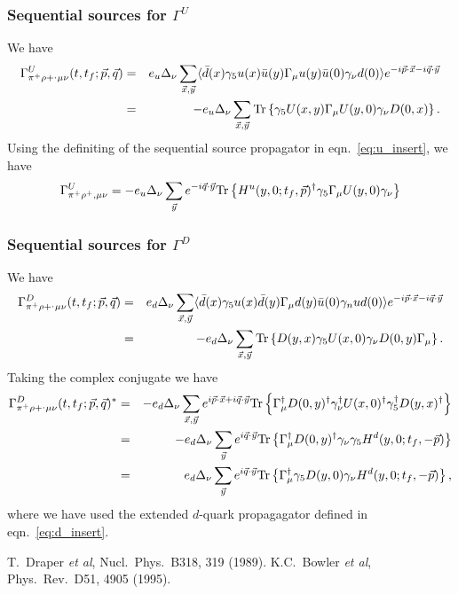 \documentclass[12pt]{article}
\newcommand{\pdotx}{\vec{p} \cdot \vec{x}}
\newcommand{\qdoty}{\vec{q} \cdot \vec{y}}
\begin{document}
\subsubsection{Sequential sources for $\Gamma^U$}
We have
\begin{eqnarray}
\Gamma^U_{\pi^+ \rho+^, \mu\nu}(t, t_f; \vec{p}, \vec{q}) & = &
e_u \Delta_{\nu} \sum_{\vec{x}, \vec{y}} \langle \bar{d}(x) \gamma_5
u(x) \bar{u}(y) \Gamma_\mu u(y) \bar{u}(0) \gamma_\nu d(0) \rangle
e^{-i\pdotx - i \qdoty}\nonumber \\
& = & - e_u \Delta_\nu \sum_{\vec{x},\vec{y}} {\rm Tr} \left\{
\gamma_5 U(x,y) \Gamma_\mu U(y,0) \gamma_{\nu} D(0,x) \right\}.
\end{eqnarray}
Using the definiting of the sequential source propagator in
eqn.~\ref{eq:u_insert}, we have
\begin{equation}
\Gamma^U_{\pi^+ \rho^+, \mu\nu} = -e_u \Delta_{\nu} \sum_{\vec{y}}
e^{-i\qdoty} {\rm Tr} \left\{ H^u(y,0; t_f, \vec{p})^{\dagger}
\gamma_5 \Gamma_\mu U(y,0) \gamma_{\nu} \right\}
\end{equation}

\subsubsection{Sequential sources for $\Gamma^D$}
We have
\begin{eqnarray}
\Gamma^D_{\pi^+ \rho+^, \mu\nu}(t, t_f; \vec{p}, \vec{q}) & = &
e_d \Delta_{\nu} \sum_{\vec{x}, \vec{y}} \langle \bar{d}(x) \gamma_5
u(x) \bar{d}(y) \Gamma_\mu d(y) \bar{u}(0) \gamma_nu d(0) \rangle
e^{-i\pdotx - i \qdoty}\nonumber \nonumber \\
& = & - e_d \Delta_\nu \sum_{\vec{x},\vec{y}} {\rm Tr} \left\{ D(y,x)
\gamma_5 U(x,0) \gamma_\nu D(0,y) \Gamma_\mu \right\}.
\end{eqnarray}
Taking the complex conjugate we have
\begin{eqnarray}
\Gamma^D_{\pi^+ \rho+^, \mu\nu}(t, t_f; \vec{p}, \vec{q})^* & = &
- e_d \Delta_\nu \sum_{\vec{x},\vec{y}} e^{i\pdotx + i \qdoty}{\rm Tr} \left\{
\Gamma_\mu^{\dagger} D(0,y)^{\dagger} \gamma_\nu^{\dagger}
U(x,0)^{\dagger} \gamma_5^{\dagger} D(y,x)^{\dagger} \right\}\nonumber
\\
& = & -e_d \Delta_{\nu} \sum_{\vec{y}} e^{i\qdoty} {\rm Tr} \left\{
\Gamma_{\mu}^{\dagger}  D(0,y)^{\dagger} \gamma_\nu \gamma_5 H^d(y,0;
t_f, -\vec{p}) \right\}\nonumber \\
& = & e_d \Delta_{\nu} \sum_{\vec{y}} e^{i \qdoty} {\rm Tr} \left\{
\Gamma_{\mu}^{\dagger} \gamma_5 D(y,0) \gamma_{\nu} H^d(y,0; t_f,
-\vec{p}) \right\},
\end{eqnarray}
where we have used the extended $d$-quark propagagator defined in
eqn.~\ref{eq:d_insert}.

\begin{thebibliography}{1}
 T.~Draper \textit{et al}, Nucl.\ Phys.\ B318, 319
  (1989).
 K.C.~Bowler \textit{et al}, Phys.\ Rev.\ D51, 4905
  (1995).
\end{thebibliography}
\end{document}
